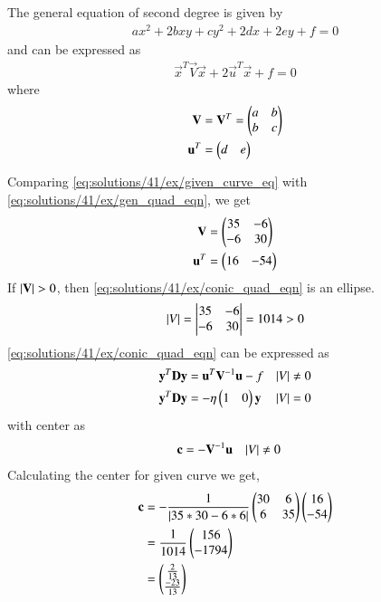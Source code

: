 The general equation of second degree is given by
\begin{align}
ax^2+2bxy+cy^2+2dx+2ey+f=0 \label{eq:solutions/41/ex/gen_quad_eqn}
\end{align}
and can be expressed as
\begin{align}
\vec{x}^T\vec{V}\vec{x}+2\vec{u}^T\vec{x}+f=0 \label{eq:solutions/41/ex/conic_quad_eqn}
\end{align}
where
\begin{align}
\mathbf{V} &= \mathbf{V}^T = \begin{pmatrix}a & b \\ b & c\end{pmatrix}
\\
\mathbf{u}^T &= \begin{pmatrix}d & e\end{pmatrix}
\end{align}

Comparing \eqref{eq:solutions/41/ex/given_curve_eq} with \eqref{eq:solutions/41/ex/gen_quad_eqn}, we get
\begin{align}
\mathbf{V} &= \begin{pmatrix}35  & -6 \\ -6 & 30\end{pmatrix}
\\
\mathbf{u}^T &= \begin{pmatrix}16 & -54\end{pmatrix}
\end{align}
If $\left\vert\mathbf{V}\right\vert > 0$, then \eqref{eq:solutions/41/ex/conic_quad_eqn} is an ellipse. 
\begin{align}
\left\vert V\right\vert = 
\begin{vmatrix}
35  & -6 \\ -6 & 30
\end{vmatrix}
= 1014 > 0
\end{align}
%
\eqref{eq:solutions/41/ex/conic_quad_eqn} can be expressed as
\begin{align}
\label{eq:solutions/41/ex/conic_simp_temp_nonparab_eq}
\mathbf{y}^T\mathbf{D}\mathbf{y} &=  \mathbf{u}^T\mathbf{V}^{-1}\mathbf{u} -f  &  \left\vert V\right\vert &\ne 0
\\
\mathbf{y}^T\mathbf{D}\mathbf{y} &=  -\eta\begin{pmatrix}1 & 0\end{pmatrix}\mathbf{y}   & \left\vert V\right\vert &= 0
\label{eq:solutions/41/ex/conic_simp_temp_parab_eq}
\end{align}
with center as 
\begin{align}
    \mathbf{c} &= - \mathbf{V}^{-1}\mathbf{u} & \left\vert V\right\vert &\ne 0
\end{align}
Calculating the center for given curve we get,
\begin{align}
    \mathbf{c} &= - \frac{1}{\left\vert35*30 - 6*6\right\vert}\begin{pmatrix}30  & 6 \\ 6 & 35\end{pmatrix}\begin{pmatrix}16 \\ -54\end{pmatrix} \\
    &= \frac{1}{1014}\begin{pmatrix}156 \\ -1794\end{pmatrix} \\
    &= \begin{pmatrix}\frac{2}{13}  \\\frac{-23}{13}\end{pmatrix}
\end{align}

